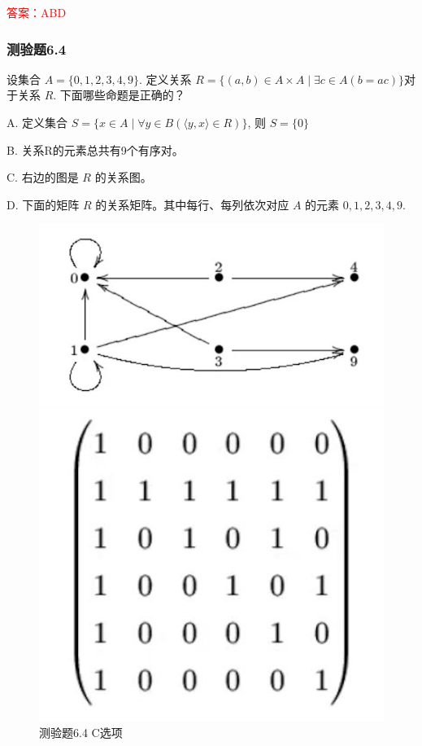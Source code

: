 \documentclass[UTF8, heading=true]{ctexart}
\begin{document}
\textcolor{red}{答案：ABD}


\subsubsection{测验题6.4}
设集合 $A=\{0,1,2,3,4,9\}$. 定义关系 $R=\{(a, b) \in A \times A \mid \exists c \in A(b=a c)\}$对于关系 $R$. 下面哪些命题是正确的？

A. 定义集合 $S=\{x \in A \mid \forall y \in B(\langle y, x\rangle \in R)\}$, 则 $S=\{0\}$

B. 
关系R的元素总共有9个有序对。

C. 
右边的图是 $R$ 的关系图。

D. 
下面的矩阵 $R$ 的关系矩阵。其中每行、每列依次对应 $A$ 的元素 $0,1,2,3,4,9$.

\begin{figure}[htbp]
    \centering
    \begin{minipage}[t]{0.45\textwidth}
        \centering
        \includegraphics[width=1\textwidth]{6.4_1.jpg} %
	      \vspace{-0.5cm}
        \caption{测验题6.4 C选项}
    \end{minipage}
	  \hspace{0.1\textwidth} %
    \begin{minipage}[t]{0.3\textwidth}
        \centering
        \includegraphics[width=1\textwidth]{6.4_2.jpg} %

\end{minipage}
\end{figure}
\end{document}
